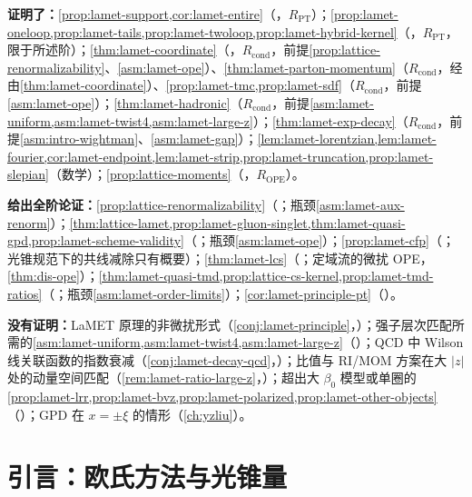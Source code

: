 \begin{tcolorbox}[enhanced,breakable,title=本章证明了什么／没有证明什么,fonttitle=\bfseries,
  colback=gray!3!white,colframe=gray!55!black,boxrule=0.6pt,arc=2pt,
  left=5pt,right=5pt,top=3pt,bottom=3pt,before skip=6pt,after skip=6pt]
\textbf{证明了：}\cref{prop:lamet-support,cor:lamet-entire}（\tagR，$R_{\mathrm{PT}}$）；\cref{prop:lamet-oneloop,prop:lamet-tails,prop:lamet-twoloop,prop:lamet-hybrid-kernel}（\tagR，$R_{\mathrm{PT}}$，限于所述阶）；\cref{thm:lamet-coordinate}（\tagR，$R_{\mathrm{cond}}$，前提\cref{prop:lattice-renormalizability}、\cref{asm:lamet-ope}）、\cref{thm:lamet-parton-momentum}（$R_{\mathrm{cond}}$，经由\cref{thm:lamet-coordinate}）、\cref{prop:lamet-tmc,prop:lamet-sdf}（$R_{\mathrm{cond}}$，前提\cref{asm:lamet-ope}）；\cref{thm:lamet-hadronic}（$R_{\mathrm{cond}}$，前提\cref{asm:lamet-uniform,asm:lamet-twist4,asm:lamet-large-z}）；\cref{thm:lamet-exp-decay}（$R_{\mathrm{cond}}$，前提\cref{asm:intro-wightman}、\cref{asm:lamet-gap}）；\cref{lem:lamet-lorentzian,lem:lamet-fourier,cor:lamet-endpoint,lem:lamet-strip,prop:lamet-truncation,prop:lamet-slepian}（数学）；\cref{prop:lattice-moments}（\tagR，$R_{\mathrm{OPE}}$）。\par
\textbf{给出全阶论证：}\cref{prop:lattice-renormalizability}（\tagA；瓶颈\cref{asm:lamet-aux-renorm}）；\cref{thm:lattice-lamet,prop:lamet-gluon-singlet,thm:lamet-quasi-gpd,prop:lamet-scheme-validity}（\tagA；瓶颈\cref{asm:lamet-ope}）；\cref{prop:lamet-cfp}（\tagA；光锥规范下的共线减除只有概要）；\cref{thm:lamet-lcs}（\tagA；定域流的微扰 OPE，\cref{thm:dis-ope}）；\cref{thm:lamet-quasi-tmd,prop:lattice-cs-kernel,prop:lamet-tmd-ratios}（\tagA；瓶颈\cref{asm:lamet-order-limits}）；\cref{cor:lamet-principle-pt}（\tagA）。\par
\textbf{没有证明：}LaMET 原理的非微扰形式（\cref{conj:lamet-principle}，\tagC）；强子层次匹配所需的\cref{asm:lamet-uniform,asm:lamet-twist4,asm:lamet-large-z}（\tagC）；QCD 中 Wilson 线关联函数的指数衰减（\cref{conj:lamet-decay-qcd}，\tagC）；比值与 RI/MOM 方案在大 $|z|$ 处的动量空间匹配（\cref{rem:lamet-ratio-large-z}，\tagC）；超出大 $\beta_0$ 模型或单圈的\cref{prop:lamet-lrr,prop:lamet-bvz,prop:lamet-polarized,prop:lamet-other-objects}（\tagP）；GPD 在 $x=\pm\xi$ 的情形（\cref{ch:yzliu}）。
\end{tcolorbox}

\section{引言：欧氏方法与光锥量}\label{sec:lamet-intro}

